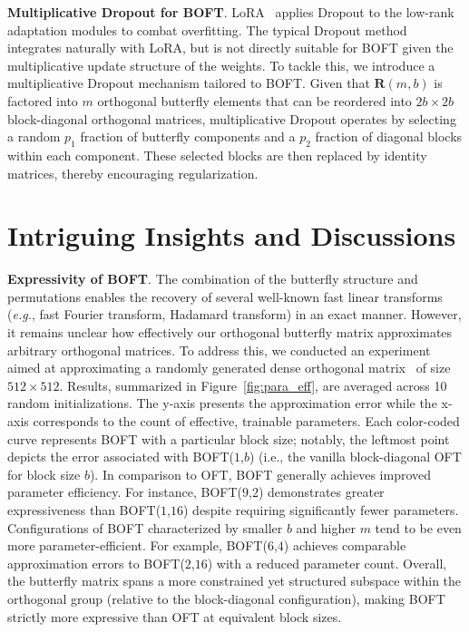 \textbf{Multiplicative Dropout for BOFT}. LoRA~\cite{hulora2022} applies Dropout to the low-rank adaptation modules to combat overfitting. The typical Dropout method~\cite{srivastava2014dropout} integrates naturally with LoRA, but is not directly suitable for BOFT given the multiplicative update structure of the weights. To tackle this, we introduce a multiplicative Dropout mechanism tailored to BOFT. Given that $\bm{R}(m,b)$ is factored into $m$ orthogonal butterfly elements that can be reordered into $2b\times 2b$ block-diagonal orthogonal matrices, multiplicative Dropout operates by selecting a random $p_1$ fraction of butterfly components and a $p_2$ fraction of diagonal blocks within each component. These selected blocks are then replaced by identity matrices, thereby encouraging regularization.

\section{Intriguing Insights and Discussions}

\textbf{Expressivity of BOFT}. The combination of the butterfly structure and permutations enables the recovery of several well-known fast linear transforms~\cite{dao2019learning,dao2019kaleidoscope} (\emph{e.g.}, fast Fourier transform, Hadamard transform) in an exact manner. However, it remains unclear how effectively our orthogonal butterfly matrix approximates arbitrary orthogonal matrices. To address this, we conducted an experiment aimed at approximating a randomly generated dense orthogonal matrix~\cite{anderson1987generation} of size $512\times 512$. Results, summarized in Figure~\ref{fig:para_eff}, are averaged across 10 random initializations. The y-axis presents the approximation error while the x-axis corresponds to the count of effective, trainable parameters. Each color-coded curve represents BOFT with a particular block size; notably, the leftmost point depicts the error associated with BOFT($1$,$b$) (i.e., the vanilla block-diagonal OFT for block size $b$). In comparison to OFT, BOFT generally achieves improved parameter efficiency. For instance, BOFT($9$,$2$) demonstrates greater expressiveness than BOFT($1$,$16$) despite requiring significantly fewer parameters. Configurations of BOFT characterized by smaller $b$ and higher $m$ tend to be even more parameter-efficient. For example, BOFT($6$,$4$) achieves comparable approximation errors to BOFT($2$,$16$) with a reduced parameter count. Overall, the butterfly matrix spans a more constrained yet structured subspace within the orthogonal group (relative to the block-diagonal configuration), making BOFT strictly more expressive than OFT at equivalent block sizes.

